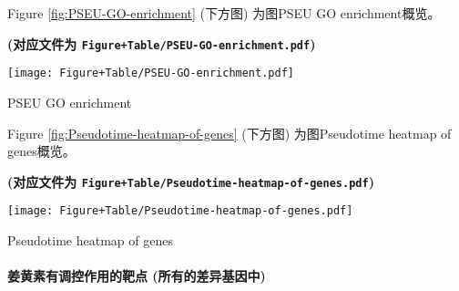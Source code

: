 \documentclass[
]{article}
\newenvironment{Shaded}{\begin{snugshade}}{\end{snugshade}}
\newcommand{\DataTypeTok}[1]{\textcolor[rgb]{0.13,0.29,0.53}{#1}}
\newcommand{\DecValTok}[1]{\textcolor[rgb]{0.00,0.00,0.81}{#1}}
\newcommand{\KeywordTok}[1]{\textcolor[rgb]{0.13,0.29,0.53}{\textbf{#1}}}
\newcommand{\NormalTok}[1]{#1}
\newcommand{\OperatorTok}[1]{\textcolor[rgb]{0.81,0.36,0.00}{\textbf{#1}}}
\newcommand{\StringTok}[1]{\textcolor[rgb]{0.31,0.60,0.02}{#1}}
\begin{document}
Figure \ref{fig:PSEU-GO-enrichment} (下方图) 为图PSEU GO enrichment概览。

\textbf{(对应文件为 \texttt{Figure+Table/PSEU-GO-enrichment.pdf})}

\def\@captype{figure}
\begin{center}
\texttt{[image: Figure+Table/PSEU-GO-enrichment.pdf]}
\caption{PSEU GO enrichment}\label{fig:PSEU-GO-enrichment}
\end{center}

\begin{Shaded}
\end{Shaded}

Figure \ref{fig:Pseudotime-heatmap-of-genes} (下方图) 为图Pseudotime heatmap of genes概览。

\textbf{(对应文件为 \texttt{Figure+Table/Pseudotime-heatmap-of-genes.pdf})}

\def\@captype{figure}
\begin{center}
\texttt{[image: Figure+Table/Pseudotime-heatmap-of-genes.pdf]}
\caption{Pseudotime heatmap of genes}\label{fig:Pseudotime-heatmap-of-genes}
\end{center}

\hypertarget{ux59dcux9ec4ux7d20ux6709ux8c03ux63a7ux4f5cux7528ux7684ux9776ux70b9-ux6240ux6709ux7684ux5deeux5f02ux57faux56e0ux4e2d}{%
\paragraph{姜黄素有调控作用的靶点 (所有的差异基因中)}\label{ux59dcux9ec4ux7d20ux6709ux8c03ux63a7ux4f5cux7528ux7684ux9776ux70b9-ux6240ux6709ux7684ux5deeux5f02ux57faux56e0ux4e2d}}
\end{document}
